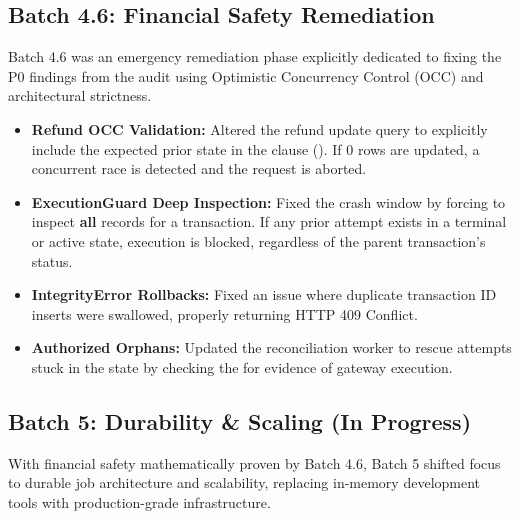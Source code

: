 \vspace{0.5cm}

\subsection{Batch 4.6: Financial Safety Remediation}

Batch 4.6 was an emergency remediation phase explicitly dedicated to fixing the P0 findings from the audit using Optimistic Concurrency Control (OCC) and architectural strictness.

\begin{tcolorbox}[batchbox={Key Implementations in Batch 4.6}]
\begin{itemize}
    \item \textbf{Refund OCC Validation:} Altered the refund update query to explicitly include the expected prior state in the  clause (). If 0 rows are updated, a concurrent race is detected and the request is aborted.
    \item \textbf{ExecutionGuard Deep Inspection:} Fixed the crash window by forcing  to inspect \textbf{all}  records for a transaction. If any prior attempt exists in a terminal or active state, execution is blocked, regardless of the parent transaction's status.
    \item \textbf{IntegrityError Rollbacks:} Fixed an issue where duplicate transaction ID inserts were swallowed, properly returning HTTP 409 Conflict.
    \item \textbf{Authorized Orphans:} Updated the reconciliation worker to rescue attempts stuck in the  state by checking the  for evidence of gateway execution.
\end{itemize}
\end{tcolorbox}

\vspace{0.5cm}

\subsection{Batch 5: Durability \& Scaling (In Progress)}

With financial safety mathematically proven by Batch 4.6, Batch 5 shifted focus to durable job architecture and scalability, replacing in-memory development tools with production-grade infrastructure.


